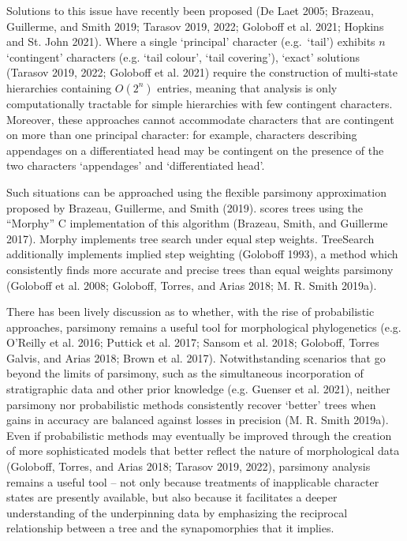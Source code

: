 Solutions to this issue have recently been proposed (De Laet 2005; Brazeau, Guillerme, and Smith 2019; Tarasov 2019, 2022; Goloboff et al. 2021; Hopkins and St. John 2021). Where a single
`principal' character (e.g.~`tail') exhibits \(n\) `contingent' characters (e.g.
`tail colour', `tail covering'), `exact' solutions (Tarasov 2019, 2022; Goloboff et al. 2021) require the construction of multi-state hierarchies containing
\(O(2^n)\) entries, meaning that analysis is only computationally tractable for
simple hierarchies with few contingent characters. Moreover, these approaches
cannot accommodate characters that are contingent on more than one principal
character: for example, characters describing appendages on a differentiated
head may be contingent on the presence of the two characters `appendages' and
`differentiated head'.

Such situations can be approached using the flexible parsimony approximation
proposed by Brazeau, Guillerme, and Smith (2019).  scores trees using the ``Morphy'' C
implementation of this algorithm (Brazeau, Smith, and Guillerme 2017). Morphy implements tree search
under equal step weights. TreeSearch additionally implements implied step
weighting (Goloboff 1993), a method which consistently finds more accurate and
precise trees than equal weights parsimony (Goloboff et al. 2008; Goloboff, Torres, and Arias 2018; M. R. Smith 2019a).

There has been lively discussion as to whether, with the rise of probabilistic
approaches, parsimony remains a useful tool for morphological phylogenetics
(e.g. O'Reilly et al. 2016; Puttick et al. 2017; Sansom et al. 2018; Goloboff, Torres Galvis, and Arias 2018; Brown et al. 2017).
Notwithstanding scenarios that go beyond the limits of parsimony, such as the
simultaneous incorporation of stratigraphic data and other prior knowledge (e.g. Guenser et al. 2021), neither parsimony nor probabilistic methods consistently recover
`better' trees when gains in accuracy are balanced against losses in precision
(M. R. Smith 2019a). Even if probabilistic methods may eventually be improved through
the creation of more sophisticated models that better reflect the nature of
morphological data (Goloboff, Torres, and Arias 2018; Tarasov 2019, 2022), parsimony
analysis remains a useful tool -- not only because treatments of inapplicable
character states are presently available, but also because it facilitates a
deeper understanding of the underpinning data by emphasizing the reciprocal
relationship between a tree and the synapomorphies that it implies.

